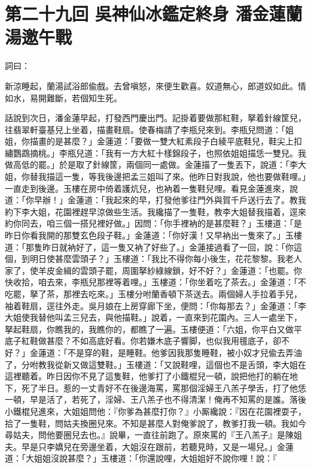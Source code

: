 
\chapter*{第二十九回 吳神仙冰鑑定終身 潘金蓮蘭湯邀午戰}


詞曰：

\begin{myquote}
新涼睡起，蘭湯試浴郎偸戲。去曾嗔怒，來便生歡喜。奴道無心，郎道奴如此。情如水，易開難斷，若個知生死。

\end{myquote}

話說到次日，潘金蓮早起，打發西門慶出門。記掛着要做那紅鞋，{}拏着針線筐兒，往翡翠軒臺基兒上坐着，描畫鞋扇。使春梅請了李瓶兒來到。李瓶兒問道：「姐姐，你描畫的是甚麼？」金蓮道：「要做一雙大紅素段子白綾平底鞋兒，鞋尖上扣繡鸚鵡摘桃。」李瓶兒道：「我有一方大紅十樣錦段子，也照依姐姐描恁一雙兒。我做高低的罷。」於是取了針線筐，兩個同一處做。金蓮描了一隻丟下，說道：「李大姐，你替我描這一隻，等我後邊把孟三姐叫了來。他昨日對我說，他也要做鞋哩。」一直走到後邊。玉樓在房中倚着護炕兒，也衲着一隻鞋兒哩。看見金蓮進來，說道：「你早辦！」金蓮道：「我起來的早，打發他爹往門外與賀千戶送行去了。教我約下李大姐，花園裡趕早涼做些生活。我纔描了一隻鞋，教李大姐替我描着，逕來約你同去，咱三個一搭兒裡好做。」因問：「你手裡衲的是甚麼鞋？」玉樓道：「是昨日你看我開的那雙玄色段子鞋。」金蓮道：「你好漢！又早衲出一隻來了。」玉樓道：「那隻昨日就衲好了，這一隻又衲了好些了。」金蓮接過看了一回，說：「你這個，到明日使甚麼雲頭子？」玉樓道：「我比不得你每小後生，花花黎黎。{}我老人家了，使羊皮金緝的雲頭子罷，周圍拏紗綠線鎖，好不好？」金蓮道：「也罷。你快收拾，咱去來，李瓶兒那裡等着哩。」玉樓道：「你坐着吃了茶去。」金蓮道：「不吃罷，拏了茶，那裡去吃來。」玉樓分咐蘭香頓下茶送去。兩個婦人手拉着手兒，袖着鞋扇，逕往外走。吳月娘在上房穿廊下坐，便問：「你每那去？」金蓮道：「李大姐使我替他叫孟三兒去，與他描鞋。」{}說着，一直來到花園內。三人一處坐下，拏起鞋扇，你瞧我的，我瞧你的，{}都瞧了一遍。玉樓便道：「六姐，你平白又做平底子紅鞋做甚麼？不如高底好看。你若嫌木底子響脚，也似我用氊底子，卻不好？」{}金蓮道：「不是穿的鞋，是睡鞋。他爹因我那隻睡鞋，被小奴才兒偸去弄油了，分咐教我從新又做這雙鞋。」玉樓道：「又說鞋哩，這個也不是舌頭，李大姐在這裡聽着。昨日因你不見了這隻鞋，他爹打了小鐵棍兒一頓，說把他打的躺在地下，死了半日。惹的一丈青好不在後邊海罵，罵那個淫婦王八羔子學舌，打了他恁一頓，早是活了，若死了，淫婦、王八羔子也不得清潔！俺再不知罵的是誰。落後小鐵棍兒進來，大姐姐問他：『你爹為甚麼打你？』小厮纔說：『因在花園裡耍子，拾了一隻鞋，問姑夫換圈兒來。不知是甚麼人對俺爹說了，教爹打我一頓。我如今尋姑夫，問他要圈兒去也。』說畢，一直往前跑了。原來罵的『王八羔子』是陳姐夫。{}早是只李嬌兒在旁邊坐着，大姐沒在跟前，若聽見時，又是一場兒。」金蓮道：「大姐姐沒說甚麼？」玉樓道：「你還說哩，大姐姐好不說你哩！說：『